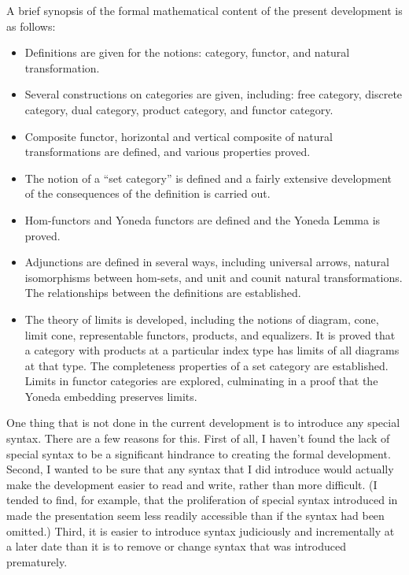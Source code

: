 \documentclass[11pt,notitlepage,a4paper]{report}
\begin{document}
A brief synopsis of the formal mathematical content of the present development is as follows:
\begin{itemize}
\item  Definitions are given for the notions: category, functor, and natural transformation.
\item  Several constructions on categories are given, including: free category,
  discrete category, dual category, product category, and functor category.
\item  Composite functor, horizontal and vertical composite of natural transformations
  are defined, and various properties proved.
\item  The notion of a ``set category'' is defined and a fairly extensive development
  of the consequences of the definition is carried out.
\item  Hom-functors and Yoneda functors are defined and the Yoneda Lemma is proved.
\item  Adjunctions are defined in several ways, including universal arrows,
  natural isomorphisms between hom-sets, and unit and counit natural transformations.
  The relationships between the definitions are established.
\item  The theory of limits is developed, including the notions of diagram, cone, limit cone,
  representable functors, products, and equalizers.  It is proved that a category with
  products at a particular index type has limits of all diagrams at that type.
  The completeness properties of a set category are established.
  Limits in functor categories are explored, culminating in a proof that the Yoneda
  embedding preserves limits.
\end{itemize}

One thing that is not done in the current development is to introduce any special syntax.
There are a few reasons for this.  First of all, I haven't found the lack of special syntax
to be a significant hindrance to creating the formal development.  Second, I wanted to be
sure that any syntax that I did introduce would actually make the development easier to read
and write, rather than more difficult.  (I tended to find, for example, that the proliferation
of special syntax introduced in \cite{Katovsky-AFP10} made the presentation seem less readily
accessible than if the syntax had been omitted.)  Third, it is easier to introduce syntax
judiciously and incrementally at a later date than it is to remove or change syntax that
was introduced prematurely.





\end{document}
